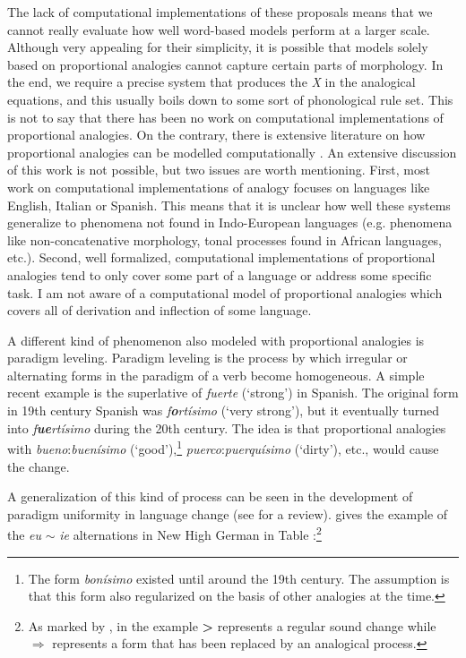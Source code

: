 The lack of computational implementations of these proposals means that we cannot really evaluate how well word-based models perform at a larger scale. Although very appealing for their simplicity, it is possible that models solely based on proportional analogies cannot capture certain parts of morphology. In the end, we require a precise system that produces the \textit{X} in the analogical equations, and this usually boils down to some sort of phonological rule set. This is not to say that there has been no work on computational implementations of proportional analogies. On the contrary, there is extensive literature on how proportional analogies can be modelled computationally \autocites{Federici.1995b, Fertig.2013, Goldsmith.2007, Lepage.1998, Pirrelli.1994a, Pirrelli.1994, Yvon.1997}. An extensive discussion of this work is not possible, but two issues are worth mentioning. First, most work on computational implementations of analogy focuses on languages like English, Italian or Spanish. This means that it is unclear how well these systems generalize to phenomena not found in Indo-European languages (e.g. phenomena like non-concatenative morphology, tonal processes found in African languages, etc.). Second, well formalized, computational implementations of proportional analogies tend to only cover some part of a language or address some specific task. I am not aware of a computational model of proportional analogies which covers all of derivation and inflection of some language.


\largerpage
A different kind of phenomenon also modeled with proportional analogies is paradigm leveling. Paradigm leveling is the process by which irregular or alternating forms in the paradigm of a verb become homogeneous. A simple recent example is the superlative of \textit{fuerte} (`strong') in Spanish. The original form in 19th century Spanish was \textit{f\textbf{o}rtísimo} (`very strong'), but it eventually turned into \textit{f\textbf{ue}rtísimo} during the 20th century. The idea is that proportional analogies with \textit{bueno}:\textit{buenísimo} (`good'),\footnote{The form \textit{bonísimo} existed until around the 19th century. The assumption is that this form also regularized on the basis of other analogies at the time.} \textit{puerco}:\textit{puerquísimo} (`dirty'), etc., would cause the change.

A generalization of this kind of process can be seen in the development of paradigm uniformity in language change (see \textcite{Albright.2008} for a review). \textcite[144]{Albright.2008} gives the example of the \textit{eu} $\sim$ \textit{ie} alternations in New High German in Table :\footnote{As marked by \textcite[144]{Albright.2008}, in the example \textbf{>} represents a regular sound change while $\Rightarrow$ represents a form that has been replaced by an analogical process.}

